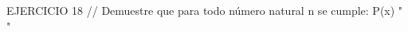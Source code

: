 \documentclass[11pt]{article}
\begin{document}
EJERCICIO 18 //
Demuestre que para todo número natural n se cumple:
P(x) " \sum  "
\end{document}
